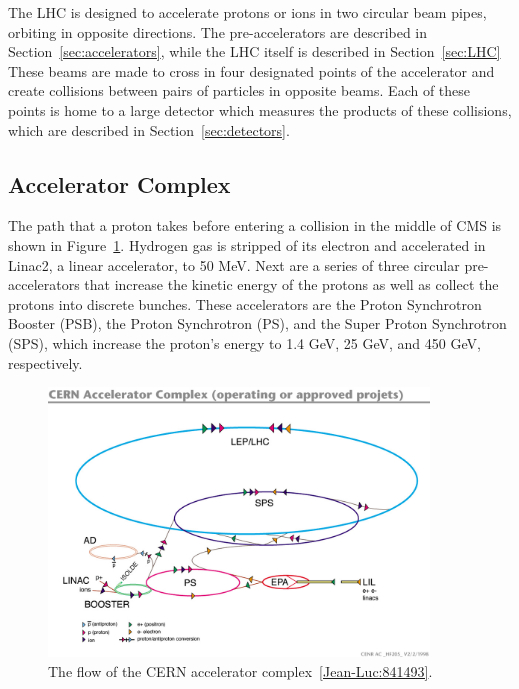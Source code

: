 The LHC is designed to accelerate protons or ions in two circular beam pipes, orbiting in opposite directions. The pre-accelerators are described in Section~\ref{sec:accelerators}, while the LHC
itself is described in Section~\ref{sec:LHC}
These beams are made to cross in four designated points of the accelerator and create collisions between
pairs of particles in opposite beams.
Each of these points is home to a large detector which measures the
products of these collisions, which are described in Section~\ref{sec:detectors}.

\subsection{Accelerator Complex\label{sec:accelerators}}

The path that a proton takes before entering a collision in the middle of CMS is shown in
Figure~\ref{fig:cern_accelerators}. Hydrogen gas is stripped of its electron and accelerated in
Linac2, a linear accelerator, to 50 MeV. Next are a series of three circular pre-accelerators that
increase the kinetic energy of the protons as well as collect the protons into discrete bunches.
These accelerators are the Proton Synchrotron Booster (PSB), the Proton Synchrotron (PS), and the
Super Proton Synchrotron (SPS), which increase the proton's energy to 1.4 GeV, 25 GeV, and 450 GeV,
respectively. 

\begin{figure}[h]
 \begin{center}
    \includegraphics[width=0.90\textwidth]{figures/experiment/lhc-pho-1991-001.jpg}
      \end{center}
\caption{The flow of the CERN accelerator complex~\ref{Jean-Luc:841493}.}
\label{fig:cern_accelerators}
\end{figure}

